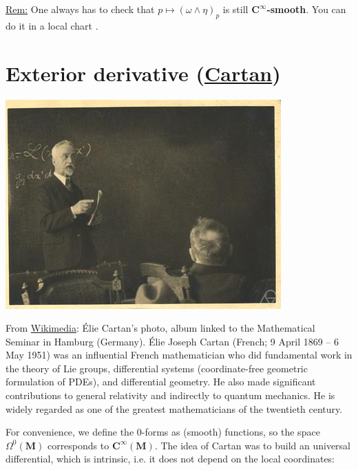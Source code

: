 \documentclass[../main.tex]{subfiles}
\begin{document}
\underline{Rem:} One always has to check that $p\mapsto(\omega\wedge\eta)_p$ is still $\mathbf{C}^{\infty}$\textbf{-smooth}. You can do it in a local chart .

\section[Exterior derivative (Cartan)]{Exterior derivative (\href{https://it.wikipedia.org/wiki/\%C3\%89lie_Joseph_Cartan}{Cartan})}\begin{marginfigure}
	\includegraphics[width=1\linewidth]{images/ElieCartanMFO.jpg}
	\caption[Élie Cartan's photo]{From \href{https://commons.wikimedia.org/wiki/File:ElieCartanMFO.jpg}{Wikimedia}: Élie Cartan's photo, album linked to the Mathematical Seminar in Hamburg (Germany). Élie Joseph Cartan (French; 9 April 1869 – 6 May 1951) was an influential French mathematician who did fundamental work in the theory of Lie groups, differential systems (coordinate-free geometric formulation of PDEs), and differential geometry. He also made significant contributions to general relativity and indirectly to quantum mechanics. He is widely regarded as one of the greatest mathematicians of the twentieth century.}
\end{marginfigure}
For convenience, we define the 0-forms as (smooth) functions, so the space $\Omega^0(\mathbf{M})$ corresponds to $\mathbf{C}^{\infty}(\mathbf{M})$. The idea of Cartan was to build an universal differential, which is intrinsic, i.e. it does not depend on the local coordinates:
\end{document}
